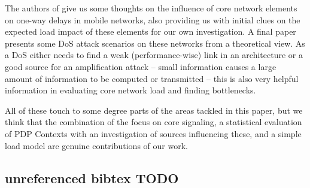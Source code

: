 The authors of \cite{4675847} give us some thoughts on the influence of core network elements on one-way delays in mobile networks, also providing us with initial clues on the expected load impact of these elements for our own investigation. A final paper \cite{Ricciato2010551} presents some \ac{DoS} attack scenarios on these networks from a theoretical view. As a \ac{DoS} either needs to find a weak (performance-wise) link in an architecture or a good source for an amplification attack -- small information causes a large amount of information to be computed or transmitted -- this is also very helpful information in evaluating core network load and finding bottlenecks.

All of these touch to some degree parts of the areas tackled in this paper, but we think that the combination of the focus on core signaling, a statistical evaluation of PDP Contexts with an investigation of sources influencing these, and a simple load model are genuine contributions of our work.



\subsection{unreferenced bibtex TODO}

